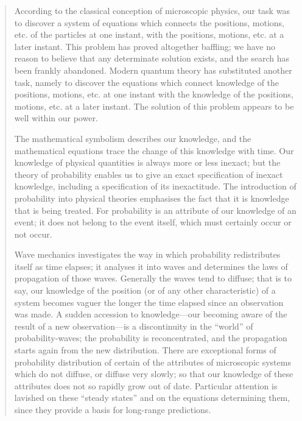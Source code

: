 \begin{quote}
    According to the classical conception of microscopic physics, our task was to discover a system of equations which connects the positions, motions, etc. of the particles at one instant, with the positions, motions, etc. at a later instant.  This problem has proved altogether baffling; we have no reason to believe that any determinate solution exists, and the search has been frankly abandoned.  Modern quantum theory has substituted another task, namely to discover the equations which connect knowledge of the positions, motions, etc. at one instant with the knowledge of the positions, motions, etc. at a later instant.  The solution of this problem appears to be well within our power.
    
    The mathematical symbolism describes our knowledge, and the mathematical equations trace the change of this knowledge with time.  Our knowledge of physical quantities is always more or less inexact; but the theory of probability enables us to give an exact specification of inexact knowledge, including a specification of its inexactitude.  The introduction of probability into physical theories emphasises the fact that it is knowledge that is being treated.  For probability is an attribute of our knowledge of an event; it does not belong to the event itself, which must certainly occur or not occur.  
    
    Wave mechanics investigates the way in which probability redistributes itself as time elapses; it analyses it into waves and determines the laws of propagation of those waves.  Generally the waves tend to diffuse; that is to say, our knowledge of the position (or of any other characteristic) of a system becomes vaguer the longer the time elapsed since an observation was made.  A sudden accession to knowledge---our becoming aware of the result of a new observation---is a discontinuity in the ``world'' of probability-waves; the probability is reconcentrated, and the propagation starts again from the new distribution.  There are exceptional forms of probability distribution of certain of the attributes of microscopic systems which do not diffuse, or diffuse very slowly; so that our knowledge of these attributes does not so rapidly grow out of date.  Particular attention is lavished on these ``steady states'' and on the equations determining them, since they provide a basis for long-range predictions.
    

\end{quote}
